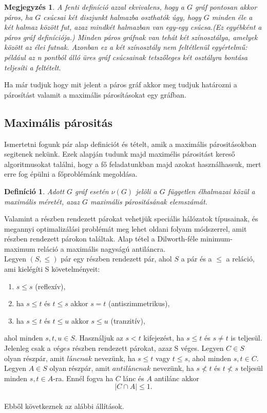 \documentclass[12pt]{article}
\newtheorem{defin}{Definíció}[section]
\newtheorem{megj}{Megjegyzés}[section]
\begin{document}
\begin{megj}
A fenti definíció azzal ekvivalens, hogy a $G$ gráf pontosan akkor páros, ha $G$ csúcsai két diszjunkt halmazba oszthatók úgy, hogy $G$ minden éle a két halmaz között fut, azaz mindkét halmazban van egy-egy csúcsa.(Ez egyébként a páros gráf definíciója.) Minden páros gráfnak van tehát két színosztálya, amelyek között az élei futnak. Azonban ez a két színosztály nem feltétlenül egyértelmű: például az n pontból álló üres gráf csúcsainak tetszőleges két osztályra bontása teljesíti a feltételt.
\end{megj}

Ha már tudjuk hogy mit jelent a páros gráf akkor meg tudjuk határozni a párosítást valamit a maximális párosításokat egy gráfban.

\subsection{Maximális párositás}

Ismertetni fogunk pár alap definiciót és tételt, amik a maximális párositásokban segitenek nekünk. Ezek alapján tudunk majd maximélis párositást kereső algoritmusokat találni, hogy a fő feladatunkban majd azokat használhassuk, mert erre fog épülni a főproblémánk megoldása.\\

\begin{defin}
Adott $G$ gráf esetén $\nu(G)$ jelöli a $G$ független élhalmazai közül a maximális méretét, azaz $G$ maximális párositásának elemszámát. ~\cite{szam:Fleiner}
\end{defin}

Valamint a részben rendezett párokat vehetjük speciális hálózatok típusainak, és megannyi optimalizálási problémát meg lehet oldani folyam módszerrel, amit részben rendezett párokon találtak. Alap tétel a Dilworth-féle minimum-maximum reláció a maximális nagyságú antiláncra. \\

Legyen $(S,\leq)$ pár egy részben rendezett pár, ahol $S$ a pár és a  $\leq$ a reláció, ami kielégíti S követelményeit:
\begin{enumerate}
\item$s \leq s$ (reflexív),
\item ha $s \leq t$ és $t \leq s$ akkor $s = t$ (antiszimmetrikus),
\item ha $s \leq t$ és $t \leq u$ akkor $s \leq u$ (tranzitív),
\end{enumerate}
ahol minden $s,t,u \in S$. Használjuk az $s < t$ kifejezést, ha $s \leq t$ és $s \neq t$ is teljesül. Jelenleg csak a $véges$ részben rendezett párokat, azaz S véges.
Legyen $C \in S$ olyan részpár, amit $láncnak$ nevezünk, ha $s \leq t$ vagy $t \leq s$, ahol minden $s,t \in C$. Legyen $A \in S$ olyan részpár, amit $antiláncnak$ nevezünk, ha $s \nless t$ és $t \nless s$ teljesül minden $s,t 
\in A$-ra. Ennél fogva ha $C$ lánc és $A$ antilánc akkor
$$|C \cap A| \leq 1.$$\\
Ebből következnek az alábbi állítások. ~\cite{bomze1999maximum}\\
\end{document}
